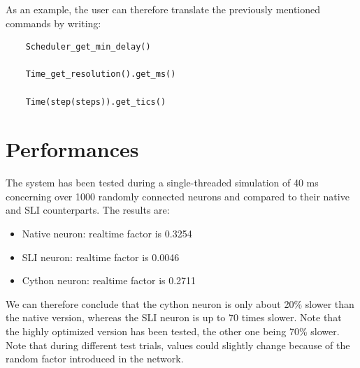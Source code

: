 \documentclass{article}
\begin{document}
As an example, the user can therefore translate the previously mentioned commands by writing:
\begin{verbatim}
    Scheduler_get_min_delay()

    Time_get_resolution().get_ms()

    Time(step(steps)).get_tics()
\end{verbatim}

\section{Performances}
The system has been tested during a single-threaded simulation of 40 ms concerning over 1000 randomly connected neurons and compared to their native and SLI counterparts. The results are:
\begin{itemize}
\item Native neuron: realtime factor is 0.3254
\item SLI neuron: realtime factor is 0.0046
\item Cython neuron: realtime factor is 0.2711
\end{itemize}
We can therefore conclude that the cython neuron is only about 20\% slower than the native version, whereas the SLI neuron is up to 70 times slower. Note that the highly optimized version has been tested, the other one being 70\% slower.\\
Note that during different test trials, values could slightly change because of the random factor introduced in the network.\\
\end{document}
